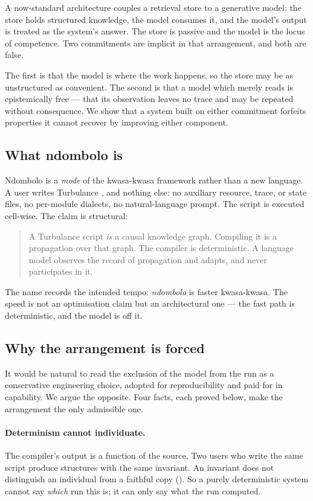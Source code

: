 \documentclass[twocolumn,11pt,a4paper]{article}
\theoremstyle{sup}
\theoremstyle{definition}
\theoremstyle{remark}
\begin{document}
A now-standard architecture couples a retrieval store to a generative model:
the store holds structured knowledge, the model consumes it, and the model's
output is treated as the system's answer. The store is passive and the model
is the locus of competence. Two commitments are implicit in that arrangement,
and both are false.

The first is that the model is where the work happens, so the store may be as
unstructured as convenient. The second is that a model which merely reads is
epistemically free --- that its observation leaves no trace and may be repeated
without consequence. We show that a system built on either commitment forfeits
properties it cannot recover by improving either component.

\subsection{What ndombolo is}

Ndombolo is a \emph{mode} of the kwasa-kwasa framework rather than a new
language. A user writes Turbulance \citep{sachikonye2025grammar}, and nothing
else: no auxiliary resource, trace, or state files, no per-module dialects, no
natural-language prompt. The script is executed cell-wise. The claim is
structural:

\begin{quote}
A Turbulance script \emph{is} a causal knowledge graph. Compiling it is a
propagation over that graph. The compiler is deterministic. A language model
observes the record of propagation and adapts, and never participates in it.
\end{quote}

The name records the intended tempo: \emph{ndombolo} is faster kwasa-kwasa. The
speed is not an optimisation claim but an architectural one --- the fast path
is deterministic, and the model is off it.

\subsection{Why the arrangement is forced}

It would be natural to read the exclusion of the model from the run as a
conservative engineering choice, adopted for reproducibility and paid for in
capability. We argue the opposite. Four facts, each proved below, make the
arrangement the only admissible one.

\paragraph{Determinism cannot individuate.} The compiler's output is a function
of the source. Two users who write the same script produce structures with the
same invariant. An invariant does not distinguish an individual from a faithful
copy (). So a purely deterministic system cannot say
\emph{which} run this is; it can only say what the run computed.
\end{document}
